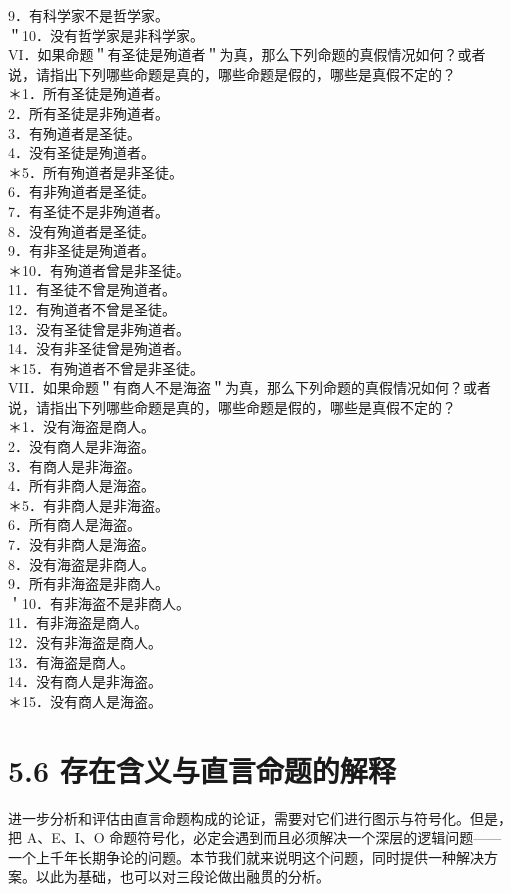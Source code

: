 9．有科学家不是哲学家。\\
＂10．没有哲学家是非科学家。\\
VI．如果命题＂有圣徒是殉道者＂为真，那么下列命题的真假情况如何？或者说，请指出下列哪些命题是真的，哪些命题是假的，哪些是真假不定的？\\
＊1．所有圣徒是殉道者。\\
2．所有圣徒是非殉道者。\\
3．有殉道者是圣徒。\\
4．没有圣徒是殉道者。\\
＊5．所有殉道者是非圣徒。\\
6．有非殉道者是圣徒。\\
7．有圣徒不是非殉道者。\\
8．没有殉道者是圣徒。\\
9．有非圣徒是殉道者。\\
＊10．有殉道者曾是非圣徒。\\
11．有圣徒不曾是殉道者。\\
12．有殉道者不曾是圣徒。\\
13．没有圣徒曾是非殉道者。\\
14．没有非圣徒曾是殉道者。\\
＊15．有殉道者不曾是非圣徒。\\
VII．如果命题＂有商人不是海盗＂为真，那么下列命题的真假情况如何？或者说，请指出下列哪些命题是真的，哪些命题是假的，哪些是真假不定的？\\
＊1．没有海盗是商人。\\
2．没有商人是非海盗。\\
3．有商人是非海盗。\\
4．所有非商人是海盗。\\
＊5．有非商人是非海盗。\\
6．所有商人是海盗。\\
7．没有非商人是海盗。\\
8．没有海盗是非商人。\\
9．所有非海盗是非商人。\\
＇10．有非海盗不是非商人。\\
11．有非海盗是商人。\\
12．没有非海盗是商人。\\
13．有海盗是商人。\\
14．没有商人是非海盗。\\
＊15．没有商人是海盗。

\section*{5.6 存在含义与直言命题的解释}
进一步分析和评估由直言命题构成的论证，需要对它们进行图示与符号化。但是，把 A、E、I、O 命题符号化，必定会遇到而且必须解决一个深层的逻辑问题——一个上千年长期争论的问题。本节我们就来说明这个问题，同时提供一种解决方案。以此为基础，也可以对三段论做出融贯的分析。


